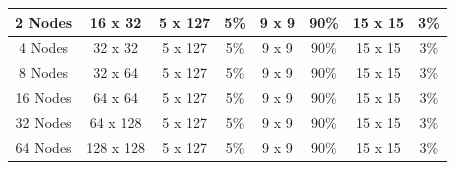 \documentclass[10pt,journal,compsoc]{IEEEtran}
\begin{document}
\begin{table}[tb]
\begin{tabular}{|c|c|c|c|c|c|c|c|}
2 Nodes                                                   & 16 x 32                                                 & 5 x 127                                                 & 5\%                                                   & 9 x 9                                                & 90\%                                                 & 15 x 15                                                             & 3\%                                                    \\ \hline
4 Nodes                                                   & 32 x 32                                                 & 5 x 127                                                 & 5\%                                                   & 9 x 9                                                & 90\%                                                 & 15 x 15                                                             & 3\%                                                    \\ \hline
8 Nodes                                                   & 32 x 64                                                 & 5 x 127                                                 & 5\%                                                   & 9 x 9                                                & 90\%                                                 & 15 x 15                                                             & 3\%                                                    \\ \hline
16 Nodes                                                  & 64 x 64                                                 & 5 x 127                                                 & 5\%                                                   & 9 x 9                                                & 90\%                                                 & 15 x 15                                                             & 3\%                                                    \\ \hline
32 Nodes                                                  & 64 x 128                                                & 5 x 127                                                 & 5\%                                                   & 9 x 9                                                & 90\%                                                 & 15 x 15                                                             & 3\%                                                    \\ \hline
64 Nodes                                                  & 128 x 128                                               & 5 x 127                                                 & 5\%                                                   & 9 x 9                                                & 90\%                                                 & 15 x 15                                                             & 3\%                                                    \\ \hline
\end{tabular}%
\label{Weak_Scaling_Models}
\end{table}
\end{document}
